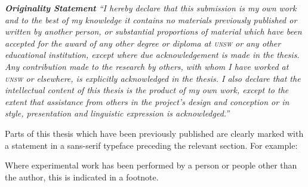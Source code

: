 \begin{center}
\begin{minipage}{0.6\textwidth}
\bigskip
\bigskip
\bigskip
\bigskip
\bigskip
\bigskip
  \textit{
    \textbf{Originality Statement}
    \smallskip
    ``I hereby declare that this submission is my own work and to the best of my knowledge it contains no materials previously published or written by another person, or substantial proportions of material which have been accepted for the award of any other degree or diploma at \textsc{unsw} or any other educational institution, except where due acknowledgement is made in the thesis. 
    Any contribution made to the research by others, with whom I have worked at \textsc{unsw} or elsewhere, is explicitly acknowledged in the thesis. 
    I also declare that the intellectual content of this thesis is the product of my own work, except to the extent that assistance from others in the project's design and conception or in style, presentation and linguistic expression is acknowledged.''
  }
\end{minipage}
\end{center}
\bigskip
\bigskip
\bigskip
\bigskip
\bigskip

Parts of this thesis which have been previously published are clearly marked with a statement in a sans-serif typeface preceding the relevant section. For example:

\smallskip
\bigskip


\smallskip
\bigskip

Where experimental work has been performed by a person or people other than the author, this is indicated in a footnote.
